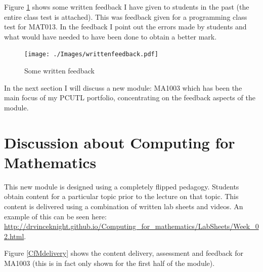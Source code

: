 \documentclass{article}
\begin{document}
Figure \ref{writtenfeedback} shows some written feedback I have given to students in the past (the entire class test is attached). This was feedback given for a programming class test for MAT013. In the feedback I point out the errors made by students and what would have needed to have been done to obtain a better mark.

\begin{figure}[htdp]
\begin{center}
\texttt{[image: ./Images/writtenfeedback.pdf]}
\end{center}
\caption{Some written feedback}\label{writtenfeedback}
\end{figure}

In the next section I will discuss a new module: MA1003 which has been the main focus of my PCUTL portfolio, concentrating on the feedback aspects of the module.

\section{Discussion about Computing for Mathematics}

This new module is designed using a completely flipped pedagogy. Students obtain content for a particular topic prior to the lecture on that topic. This content is delivered using a combination of written lab sheets and videos. An example of this can be seen here: \url{http://drvinceknight.github.io/Computing_for_mathematics/LabSheets/Week_02.html}.

Figure \ref{CfMdelivery} shows the content delivery, assessment and feedback for MA1003 (this is in fact only shown for the first half of the module).
\end{document}
